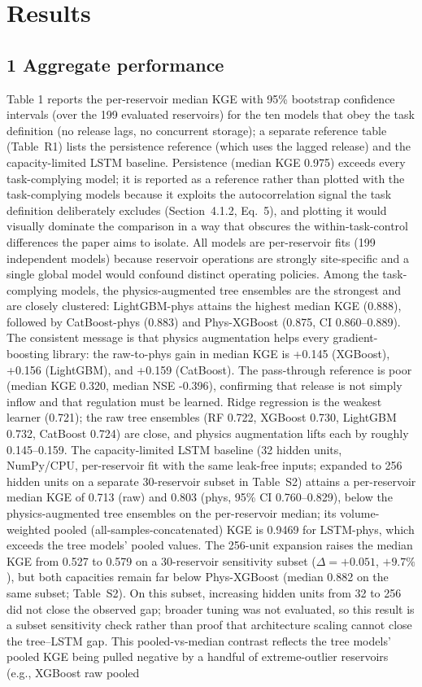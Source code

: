 \documentclass[journal]{ascelike-new}
\begin{document}
\section{Results}


\subsection{1 Aggregate performance}


Table 1 reports the per-reservoir median KGE with 95\% bootstrap confidence intervals (over the 199 evaluated reservoirs) for the ten models that obey the task definition (no release lags, no concurrent storage); a separate reference table (Table~R1) lists the persistence reference (which uses the lagged release) and the capacity-limited LSTM baseline. Persistence (median KGE 0.975) exceeds every task-complying model; it is reported as a reference rather than plotted with the task-complying models because it exploits the autocorrelation signal the task definition deliberately excludes (Section~4.1.2, Eq.~5), and plotting it would visually dominate the comparison in a way that obscures the within-task-control differences the paper aims to isolate. All models are per-reservoir fits (199 independent models) because reservoir operations are strongly site-specific and a single global model would confound distinct operating policies. Among the task-complying models, the physics-augmented tree ensembles are the strongest and are closely clustered: LightGBM-phys attains the highest median KGE (0.888), followed by CatBoost-phys (0.883) and Phys-XGBoost (0.875, CI 0.860--0.889). The consistent message is that physics augmentation helps every gradient-boosting library: the raw-to-phys gain in median KGE is +0.145 (XGBoost), +0.156 (LightGBM), and +0.159 (CatBoost). The pass-through reference is poor (median KGE 0.320, median NSE -0.396), confirming that release is not simply inflow and that regulation must be learned. Ridge regression is the weakest learner (0.721); the raw tree ensembles (RF 0.722, XGBoost 0.730, LightGBM 0.732, CatBoost 0.724) are close, and physics augmentation lifts each by roughly 0.145--0.159. The capacity-limited LSTM baseline (32 hidden units, NumPy/CPU, per-reservoir fit with the same leak-free inputs; expanded to 256 hidden units on a separate 30-reservoir subset in Table~S2) attains a per-reservoir median KGE of 0.713 (raw) and 0.803 (phys, 95\% CI 0.760--0.829), below the physics-augmented tree ensembles on the per-reservoir median; its volume-weighted pooled (all-samples-concatenated) KGE is 0.9469 for LSTM-phys, which exceeds the tree models' pooled values. The 256-unit expansion raises the median KGE from 0.527 to 0.579 on a 30-reservoir sensitivity subset ($\Delta = +0.051$, $+9.7\%$), but both capacities remain far below Phys-XGBoost (median 0.882 on the same subset; Table~S2). On this subset, increasing hidden units from 32 to 256 did not close the observed gap; broader tuning was not evaluated, so this result is a subset sensitivity check rather than proof that architecture scaling cannot close the tree--LSTM gap. This pooled-vs-median contrast reflects the tree models' pooled KGE being pulled negative by a handful of extreme-outlier reservoirs (e.g., XGBoost raw pooled 
\end{document}
